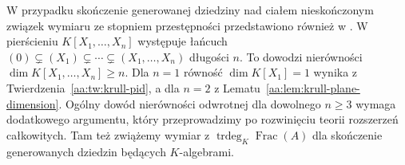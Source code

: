 \begin{uwaga}
\label{aa:uw:krull-transcendence-preview}
W przypadku skończenie generowanej dziedziny nad ciałem nieskończonym związek wymiaru ze stopniem przestępności przedstawiono również w .
W pierścieniu $K[X_1,\ldots,X_n]$ występuje łańcuch
$(0)\subsetneq(X_1)\subsetneq\cdots\subsetneq
(X_1,\ldots,X_n)$ długości $n$. To dowodzi nierówności
$\dim K[X_1,\ldots,X_n]\ge n$.
Dla $n=1$ równość $\dim K[X_1]=1$ wynika
z Twierdzenia~\ref{aa:tw:krull-pid}, a dla $n=2$
z Lematu~\ref{aa:lem:krull-plane-dimension}.
Ogólny dowód nierówności odwrotnej dla dowolnego
$n\ge3$ wymaga dodatkowego argumentu, który przeprowadzimy
po rozwinięciu teorii rozszerzeń całkowitych.
Tam też zwiążemy wymiar z
$\operatorname{trdeg}_K\operatorname{Frac}(A)$ dla skończenie
generowanych dziedzin będących $K$-algebrami.
\end{uwaga}
